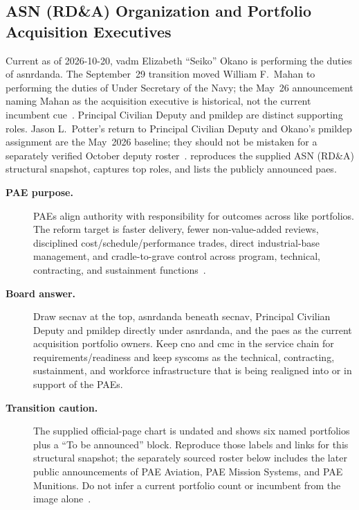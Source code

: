 \documentclass[../main.tex]{subfiles}
\begin{document}
\begin{description}
\begin{itemize}
        \end{itemize}
\end{description}

\subsection{ASN (RD\&A) Organization and Portfolio Acquisition Executives}

Current as of 2026-10-20, \ac{vadm} Elizabeth ``Seiko'' Okano is performing the duties of \ac{asnrdanda}. The September~29 transition moved William F.\ Mahan to performing the duties of Under Secretary of the Navy; the May~26 announcement naming Mahan as the acquisition executive is historical, not the current incumbent cue~\autocite{ExecutiveGov-ASNRDA-Sep2026,DONCIO-Okano-PTDO-2026}. Principal Civilian Deputy and \ac{pmildep} are distinct supporting roles. Jason L.\ Potter's return to Principal Civilian Deputy and Okano's \ac{pmildep} assignment are the May~2026 baseline; they should not be mistaken for a separately verified October deputy roster~\autocite{DON-New-SAE-2026}. \Fig{\ref{fig:asnrda_org_chart}} reproduces the supplied ASN (RD\&A) structural snapshot, \Tab{\ref{tab:asnrda_leadership}} captures top roles, and \Tab{\ref{tab:pae-roster-current}} lists the publicly announced \acp{pae}.

\begin{description}
  \item[\textbf{PAE purpose.}] PAEs align authority with responsibility for outcomes across like portfolios. The reform target is faster delivery, fewer non-value-added reviews, disciplined cost/schedule/performance trades, direct industrial-base management, and cradle-to-grave control across program, technical, contracting, and sustainment functions~\autocite{DON-PAE-Establishment-2026,DON-PAE-Expansion-May2026}.
  \item[\textbf{Board answer.}] Draw \ac{secnav} at the top, \ac{asnrdanda} beneath \ac{secnav}, Principal Civilian Deputy and \ac{pmildep} directly under \ac{asnrdanda}, and the \acp{pae} as the current acquisition portfolio owners. Keep \ac{cno} and \ac{cmc} in the service chain for requirements/readiness and keep \acp{syscom} as the technical, contracting, sustainment, and workforce infrastructure that is being realigned into or in support of the PAEs.
  \item[\textbf{Transition caution.}] The supplied official-page chart is undated and shows six named portfolios plus a ``To be announced'' block. Reproduce those labels and links for this structural snapshot; the separately sourced roster below includes the later public announcements of PAE Aviation, PAE Mission Systems, and PAE Munitions. Do not infer a current portfolio count or incumbent from the image alone~\autocite{asnrda-chart-supplied-20261020,DON-PAE-Expansion-May2026}.
\end{description}
\end{document}
